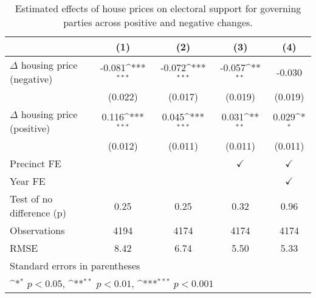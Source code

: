 \begin{table}[htbp]\centering
\def\sym#1{\ifmmode^{#1}\else\(^{#1}\)\fi}
\caption{Estimated effects of house prices on electoral support for governing parties across positive and negative changes.} \label{preposneg}
\begin{tabular}{l*{4}{c}}
\hline\hline
                    &\multicolumn{1}{c}{(1)}         &\multicolumn{1}{c}{(2)}         &\multicolumn{1}{c}{(3)}         &\multicolumn{1}{c}{(4)}         \\
\hline
$\Delta$ housing price (negative)&      -0.081\sym{***}&      -0.072\sym{***}&      -0.057\sym{**} &      -0.030         \\
                    &     (0.022)         &     (0.017)         &     (0.019)         &     (0.019)         \\
[1em]
$\Delta$ housing price (positive)&       0.116\sym{***}&       0.045\sym{***}&       0.031\sym{**} &       0.029\sym{*}  \\
                    &     (0.012)         &     (0.011)         &     (0.011)         &     (0.011)         \\
[1em]
\hline Precinct FE  &                     &                     &$\checkmark$         &$\checkmark$         \\
[1em]
Year FE             &                     &                     &                     &$\checkmark$         \\
\hline
Test of no difference (p)&        0.25         &        0.25         &        0.32         &        0.96         \\
Observations        &        4194         &        4174         &        4174         &        4174         \\
RMSE                &        8.42         &        6.74         &        5.50         &        5.33         \\
\hline\hline
\multicolumn{5}{l}{\footnotesize Standard errors in parentheses}\\
\multicolumn{5}{l}{\footnotesize \sym{*} \(p<0.05\), \sym{**} \(p<0.01\), \sym{***} \(p<0.001\)}\\
\end{tabular}
\end{table}

